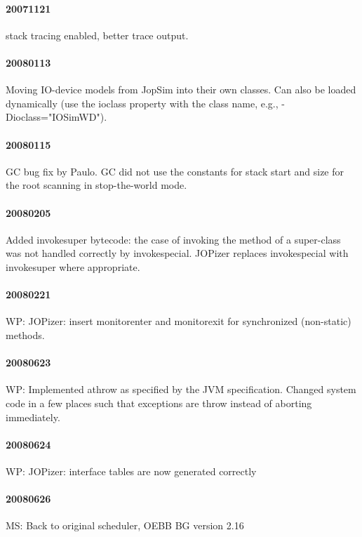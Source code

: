 \documentclass[a4paper,12pt]{scrartcl}
\newcommand{\code}[1]{{\textsf{#1}}}
\begin{document}
\paragraph{20071121} stack tracing enabled, better trace output.

\paragraph{20080113} Moving IO-device models from JopSim into their
own classes. Can also be loaded dynamically (use the \code{ioclass}
property with the class name, e.g., \code{-Dioclass="IOSimWD"}).

\paragraph{20080115} GC bug fix by Paulo. GC did not use the
constants for stack start and size for the root scanning in
stop-the-world mode.

\paragraph{20080205}

Added invokesuper bytecode: the case of invoking the method of a
super-class was not handled correctly by invokespecial. JOPizer
replaces invokespecial with invokesuper where appropriate.

\paragraph{20080221} WP: JOPizer: insert monitorenter and monitorexit for
synchronized (non-static) methods.

\paragraph{20080623} WP: Implemented athrow as specified by the JVM specification. Changed
system code in a few places such that exceptions are throw instead of
aborting immediately.

\paragraph{20080624} WP: JOPizer: interface tables are now generated correctly

\paragraph{20080626} MS: Back to original scheduler, OEBB BG version
2.16
\end{document}
